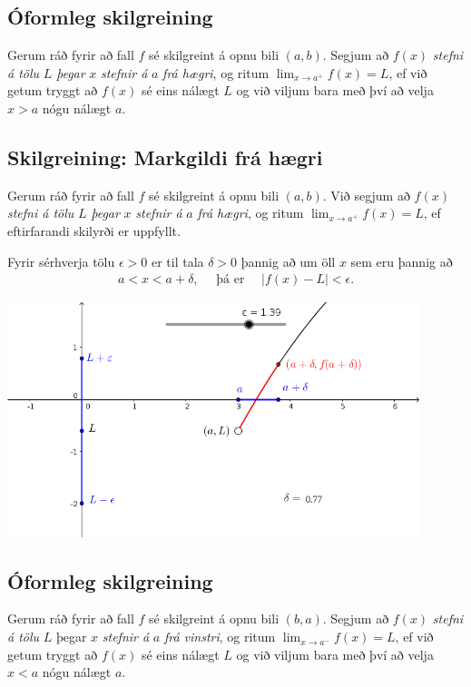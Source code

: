 \documentclass[a4paper,10pt,icelandic]{sphinxmanual}
\begin{document}
\subsection{Óformleg skilgreining}
\label{kafli02:oformleg-skilgreining}\label{kafli02:index-1}
Gerum ráð fyrir að fall \(f\) sé skilgreint á opnu bili
\((a,b)\). Segjum að \(f(x)\) \emph{stefni á tölu} \(L\) \emph{þegar}
\(x\) \emph{stefnir á} \(a\) \emph{frá hægri}, og ritum
\(\lim_{x\rightarrow a^+} f(x)=L\), ef við getum tryggt að
\(f(x)\) sé eins nálægt \(L\) og við viljum bara með því að
velja \(x>a\) nógu nálægt \(a\).


\subsection{Skilgreining: Markgildi frá hægri}
\label{kafli02:skilgreining-markgildi-fra-haegri}
Gerum ráð fyrir að fall \(f\) sé skilgreint á opnu bili
\((a,b)\). Við segjum að \(f(x)\) \emph{stefni á tölu} \(L\)
\emph{þegar} \(x\) \emph{stefnir á} \(a\) \emph{frá hægri}, og ritum
\(\lim_{x\rightarrow a^+} f(x)=L\), ef eftirfarandi skilyrði er
uppfyllt.

Fyrir sérhverja tölu \(\epsilon>0\) er til tala \(\delta>0\)
þannig að um öll \(x\) sem eru þannig að
\begin{equation*}
\begin{split}a<x<a+\delta,\quad \text{ þá er } \quad |f(x)-L| <\epsilon.\end{split}
\end{equation*}

\begin{center}
\includegraphics[width=12cm,keepaspectratio=true]{02_markfrahaegri.png}
\end{center}



\subsection{Óformleg skilgreining}
\label{kafli02:id2}\label{kafli02:index-2}
Gerum ráð fyrir að fall \(f\) sé skilgreint á opnu bili
\((b,a)\). Segjum að \(f(x)\) \emph{stefni á tölu} \(L\) þegar
\(x\) \emph{stefnir á} \(a\) \emph{frá vinstri}, og ritum
\(\lim_{x\rightarrow a^-} f(x)=L\), ef við getum tryggt að
\(f(x)\) sé eins nálægt \(L\) og við viljum bara með því að
velja \(x<a\) nógu nálægt \(a\).
\end{document}
